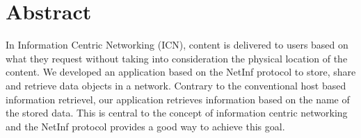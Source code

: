 \section{Abstract}
In Information Centric Networking (ICN), content is delivered to users based on what they request without taking into consideration the physical location of the content. We developed an application based on the NetInf protocol to store, share and retrieve data objects in a network. Contrary to the conventional host based information retrievel, our application retrieves information based on the name of the stored data. This is central to the concept of information centric networking and the Net‌Inf protocol provides a good way to achieve this goal.    
